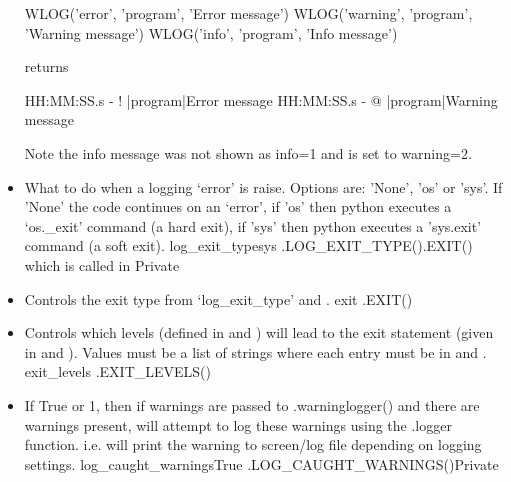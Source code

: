 \begin{itemize}
\begin{minipage}[t]{\textwidth}
\begin{thighlight}
\begin{pythonbox}
WLOG('error', 'program', 'Error message')
WLOG('warning', 'program', 'Warning message')
WLOG('info', 'program', 'Info message')
\end{pythonbox}
returns
\begin{cmdboxprint}
HH:MM:SS.s - ! |program|Error message
HH:MM:SS.s - @ |program|Warning message
\end{cmdboxprint}
\begin{note}
Note the info message was not shown as info=1 and  is set to warning=2.
\end{note}
\end{thighlight}
\end{minipage}
\fi


\ifdevguide
\item {} 
{What to do when a logging `error' is raise. Options are: 'None', 'os' or 'sys'. If 'None' the code continues on an `error', if 'os' then python executes a `os.\_exit' command (a hard exit), if 'sys' then python executes a 'sys.exit' command (a soft exit).}
{log\_exit\_type}{sys}
{\AllRecipes}{\spirouConst.LOG\_EXIT\_TYPE()}{\spirouConst.EXIT() which is called in \spirouLog}{Private}
\fi

\ifdevguide
\item {} 
{Controls the exit type from `log\_exit\_type' and .}
{exit}
{\AllRecipes}{\spirouConst.EXIT()}{\spirouLog}
\fi


\ifdevguide
\item {} 
{Controls which levels (defined in  and ) will lead to the exit statement (given in  and ). Values must be a list of strings where each entry must be in  and .}
{exit\_levels}
{\AllRecipes}{\spirouConst.EXIT\_LEVELS()}{\spirouLog}
\fi


\ifdevguide
\item {}
{If True or 1, then if warnings are passed to \spirouLog.warninglogger() and there are warnings present, will attempt to log these warnings using the \spirouLog.logger function. i.e. will print the warning to screen/log file depending on logging settings.}
{log\_caught\_warnings}{True}
{\AllRecipes}{\spirouConst.LOG\_CAUGHT\_WARNINGS()}{\spirouLog}{Private}
\fi


\end{itemize}
